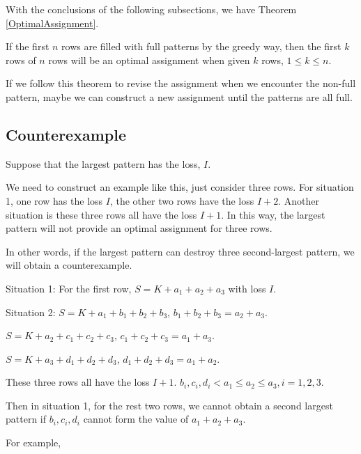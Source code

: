 With the conclusions of the following subsections, we have Theorem \ref{OptimalAssignment}.


\begin{thm}\label{OptimalAssignment}
If the first $n$ rows are filled with full patterns by the greedy way, then the first $k$ rows of $n$ rows will be an optimal assignment when given $k$ rows, $1 \leq k \leq n$.
\end{thm}

If we follow this theorem to revise the assignment when we encounter the non-full pattern, maybe we can construct a new assignment until the patterns are all full.



\subsection{Counterexample}
Suppose that the largest pattern has the loss, $I$.

We need to construct an example like this, just consider three rows. For situation 1, one row has the loss $I$, the other two rows have the loss $I+2$. Another situation is these three rows all have the loss $I+1$. In this way, the largest pattern will not provide an optimal assignment for three rows.

In other words, if the largest pattern can destroy three second-largest pattern, we will obtain a counterexample.

Situation 1:
For the first row, $S = K + a_1 + a_2 + a_3$ with loss $I$.

Situation 2:
$S = K + a_1 + b_1 + b_2 + b_3$, $b_1 + b_2 + b_3 = a_2 + a_3$.

$S = K + a_2 + c_1 + c_2 + c_3$, $c_1 + c_2 + c_3 = a_1 + a_3$.

$S = K + a_3 + d_1 + d_2 + d_3$, $d_1 + d_2 + d_3 = a_1 + a_2$.

These three rows all have the loss $I+1$. $b_i,c_i,d_i < a_1 \leq a_2 \leq a_3, i=1,2,3$.

Then in situation 1, for the rest two rows, we cannot obtain a second largest pattern if $b_i,c_i,d_i$ cannot form the value of $a_1 + a_2 + a_3$.

For example,

